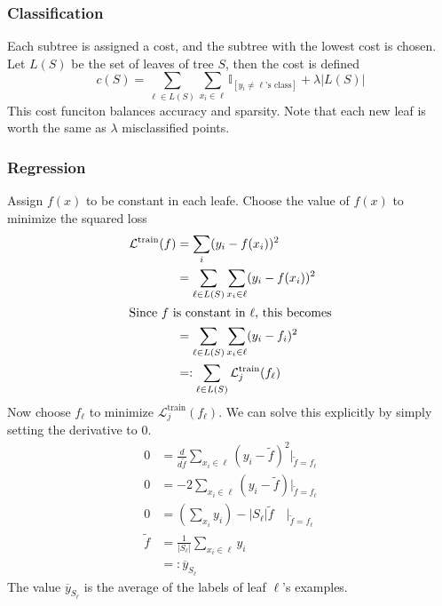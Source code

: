 \documentclass{article}
\begin{document}

\subsubsection{Classification}

Each subtree is assigned a cost, and the subtree with the lowest cost is chosen. Let $L(S)$ be the set of leaves of tree $S$, then the cost is defined
\[
	c(S) = \sum_{\ell \in L(S)} \sum_{x_i \in \ell} \mathbb{I}_{[y_i \neq \ell \text{'s class}]} + \lambda |L(S)|
\]
This cost funciton balances accuracy and sparsity. Note that each new leaf is worth the same as $\lambda$ misclassified points.


\subsubsection{Regression}
Assign $f(x)$ to be constant in each leafe. Choose the value of $f(x)$ to minimize the squared loss
\begin{align*}
	\mathcal{L}^{\text{train}}(f) &= \sum_i (y_i - f(x_i))^2 \\
				      &= \sum_{\ell \in L(S)} \sum_{x_i \in \ell} (y_i - f(x_i))^2 \\
				      \intertext{Since $f$ is constant in $\ell$, this becomes}
				      &= \sum_{\ell \in L(S)} \sum_{x_i \in \ell} (y_i - f_i)^2 \\
				      &=: \sum_{\ell \in L(S)} \mathcal{L}_j^{\text{train}}(f_\ell)
\end{align*}
Now choose $f_\ell$ to minimize $\mathcal{L}_j^{\text{train}}(f_\ell)$. We can solve this explicitly by simply setting the derivative to 0.
\begin{align*}
	0 &= \frac{d }{d \tilde{f}} \sum_{x_i \in \ell} (y_i - \tilde{f})^2 \Big|_{\tilde{f}=f_\ell} \\
	0 &= -2 \sum_{x_i \in \ell} (y_i - \tilde{f}) \Big|_{\tilde{f}=f_\ell} \\
	0 &= \left( \sum_{x_i} y_i \right) - |S_\ell| \tilde{f} \quad \Big|_{\tilde{f}=f_\ell} \\
	\tilde{f} &= \frac{1}{|S_\ell|} \sum_{x_i \in \ell} y_i \\
		  &=: \overline{y}_{S_\ell}
\end{align*}
The value $\overline{y}_{S_\ell}$ is the average of the labels of leaf $\ell$'s examples.
\end{document}
